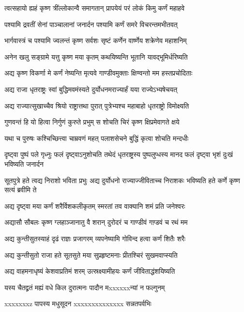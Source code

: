 \twolineshloka
{त्वत्सहायो ह्यहं कृष्ण त्रींल्लोकान्वै समागतान्}
{प्रापयेयं परं लोकं किमु कर्णं महाहवे}


\twolineshloka
{पश्यामि द्रवतीं सेनां पाञ्चालानां जनार्दन}
{पश्यामि कर्णं समरे विचरन्तमभीतवत्}


\twolineshloka
{भार्गवास्त्रं च पश्यामि ज्वलन्तं कृष्ण सर्वशः}
{सृष्टं कर्णेन वार्ष्णेय शक्रेणेव महाशनिम्}


\twolineshloka
{अनेन खलु सङ्ग्रामे यत्तु कृष्ण मया कृतम्}
{कथयिष्यन्ति भूतानि यावद्भूमिर्धरिष्यति}


\twolineshloka
{अद्य कृष्ण विकर्णा मे कर्णं नेष्यन्ति मृत्यवे}
{गाण्डीवमुक्ताः क्षिण्वन्तो मम हस्तप्रचोदिताः}


\twolineshloka
{अद्य राजा धृतराष्ट्रः स्वां बुद्धिमवमंस्यते}
{दुर्योधनमराज्यार्हं यया राज्येऽभ्यषेचयत्}


\twolineshloka
{अद्य राज्यात्सुखाच्चैव श्रियो राष्ट्रात्तथा पुरात्}
{पुत्रेभ्यश्च महाबाहो धृतराष्ट्रो विमोक्ष्यति}


\twolineshloka
{गुणवन्तं हि यो हित्वा निर्गुणं कुरुते प्रभुम्}
{स शोचति चिरं कृष्ण क्षिप्रमेवागते क्षये}


\twolineshloka
{यथा च पुरुषः कश्चिच्छित्त्वा चाम्रवणं महत्}
{पलाशसेचने बुद्धिं कृत्वा शोचति मन्दधीः}


\threelineshloka
{दृष्ट्वा पुष्पं पले गृध्नुः फलं दृष्ट्वाऽनुशोचति}
{तथेदं धृतराष्ट्रस्य पुष्पलुप्धस्य मानद}
{फलं दृष्ट्वा भृशं दुःखं भविष्यति जनार्दन}


सूतपुत्रे हते त्वद्य निराशो भविता प्रभुः
\twolineshloka
{अद्य दुर्योधनो राज्याज्जीविताच्च निराशकः}
{भविष्यति हते कर्णे कृष्ण सत्यं ब्रवीमि ते}


\twolineshloka
{अद्य दृष्ट्वा मया कर्णं शरैर्विशकलीकृतम्}
{स्मरतां तव वाक्यानि शमं प्रति जनेश्वरः}


\twolineshloka
{अद्यासौ सौबलः कृष्ण ग्लहाञ्जानातु वै शरान्}
{दुरोदरं च गाण्डीवं गण़्डवं च रथं मम}


\twolineshloka
{अद्य कुन्तीसुतस्याहं दृढं राज्ञः प्रजागरम्}
{व्यपनेष्यामि गोविन्द हत्वा कर्णं शितैः शरैः}


\twolineshloka
{अद्य कुन्तीसुतो राजा हते सूतसुते मया}
{सुप्रहृष्टमनाः प्रीतश्चिरं सुखमवाप्स्यति}


\twolineshloka
{अद्य वाहमनाधृष्यं केशवाप्रतिमं शरम्}
{उत्स्रक्ष्यामीहयः कर्णं जीविताद्धंशयिष्यति}


\twolineshloka
{यस्य चैतद्व्रतं मह्यं वधे किल दुरात्मनः}
{पादौन मxxxxxxन्यां न फल्गुनम्}


\twolineshloka
{xxxxxxxz पापस्य मधुसूदन}
{xxxxxxxxxxxxxx सन्नतपर्वभिः}


